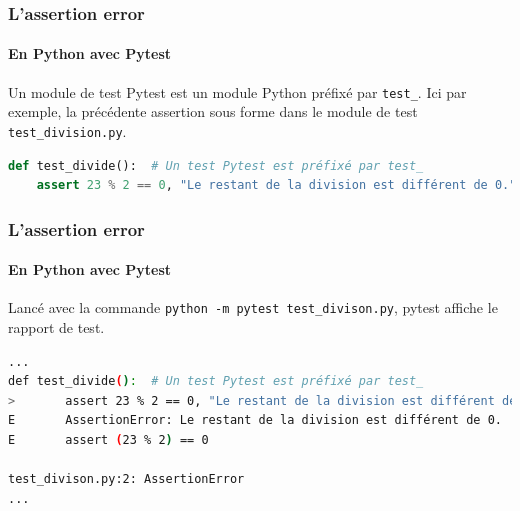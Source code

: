 \documentclass{beamer}
\begin{document}
    \begin{frame}[fragile]
        \frametitle{L'assertion error}
        \framesubtitle{En Python avec Pytest}
        \transdissolve
        Un module de test Pytest est un module Python préfixé par \lstinline{test_}.
        Ici par exemple, la précédente assertion sous forme dans le module de test \lstinline{test_division.py}.
        \begin{lstlisting}[language=Python]
def test_divide():  # Un test Pytest est préfixé par test_
    assert 23 % 2 == 0, "Le restant de la division est différent de 0."
        \end{lstlisting}
    \end{frame}

    \begin{frame}[fragile]
        \frametitle{L'assertion error}
        \framesubtitle{En Python avec Pytest}
        \transdissolve
        Lancé avec la commande \lstinline{python -m pytest test_divison.py}, pytest affiche le rapport de test.
        \begin{lstlisting}[language=sh]
...
def test_divide():  # Un test Pytest est préfixé par test_
>       assert 23 % 2 == 0, "Le restant de la division est différent de 0."
E       AssertionError: Le restant de la division est différent de 0.
E       assert (23 % 2) == 0

test_divison.py:2: AssertionError
...
        \end{lstlisting}
    \end{frame}
\end{document}
